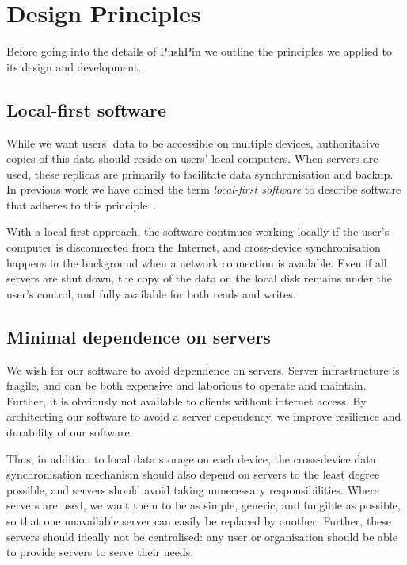 \documentclass[sigplan,10pt]{acmart}
\begin{document}
\section{Design Principles}\label{sec:principles}

Before going into the details of PushPin we outline the principles we applied to its design and development.

\subsection{Local-first software}

While we want users' data to be accessible on multiple devices, authoritative copies of this data should reside on users' local computers.
When servers are used, these replicas are primarily to facilitate data synchronisation and backup.
In previous work we have coined the term \emph{local-first software} to describe software that adheres to this principle~\cite{LocalFirst}.

With a local-first approach, the software continues working locally if the user's computer is disconnected from the Internet, and cross-device synchronisation happens in the background when a network connection is available.
Even if all servers are shut down, the copy of the data on the local disk remains under the user's control, and fully available for both reads and writes.

\subsection{Minimal dependence on servers}

We wish for our software to avoid dependence on servers. Server infrastructure is fragile, and can be both expensive and laborious to operate and maintain. Further, it is obviously not available to clients without internet access. By architecting our software to avoid a server dependency, we improve resilience and durability of our software.

Thus, in addition to local data storage on each device, the cross-device data synchronisation mechanism should also depend on servers to the least degree possible, and servers should avoid taking unnecessary responsibilities. Where servers are used, we want them to be as simple, generic, and fungible as possible, so that one unavailable server can easily be replaced by another. Further, these servers should ideally not be centralised: any user or organisation should be able to provide servers to serve their needs.
\end{document}
